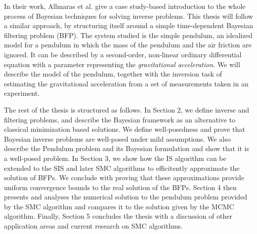 In their work, Allmaras et al. \cite{bayes-tutorial} give a case study-based introduction to the whole process of Bayesian techniques for solving inverse problems. This thesis will follow a similar approach, by structuring itself around a simple time-dependent Bayesian filtering problem (BFP). The system studied is the simple pendulum, an idealized model for a pendulum in which the mass of the pendulum and the air friction are ignored. It can be described by a second-order, non-linear ordinary differential equation with a parameter representing the \textit{gravitational acceleration}. We will describe the model of the pendulum, together with the inversion task of estimating the gravitational acceleration from a set of measurements taken in an experiment. 

The rest of the thesis is structured as follows. In Section 2, we define inverse and filtering problems, and describe the Bayesian framework as an alternative to classical minimization based solutions. We define well-posedness and prove that Bayesian inverse problems are well-posed under mild assumptions. We also describe the Pendulum problem and its Bayesian formulation and show that it is a well-posed problem. In Section 3, we show how the IS algorithm can be extended to the SIS and later SMC algorithms to efficitently approximate the solution of BFPs. We conclude with proving that these approximations provide uniform convergence bounds to the real solution of the BFPs. Section 4 then presents and analyses the numerical solution to the pendulum problem provided by the SMC algorithm and compares it to the solution given by the MCMC algorithm. Finally, Section 5 concludes the thesis with a discussion of other application areas and current research on SMC algorithms.

